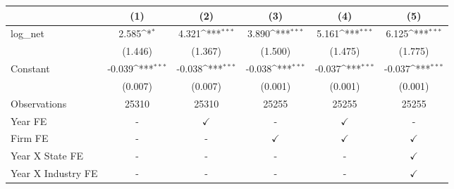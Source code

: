{
\def\sym#1{\ifmmode^{#1}\else\(^{#1}\)\fi}
\begin{tabular}{l*{5}{c}}
\toprule
                    &\multicolumn{1}{c}{(1)}         &\multicolumn{1}{c}{(2)}         &\multicolumn{1}{c}{(3)}         &\multicolumn{1}{c}{(4)}         &\multicolumn{1}{c}{(5)}         \\
\midrule
log\_net             &       2.585\sym{*}  &       4.321\sym{***}&       3.890\sym{***}&       5.161\sym{***}&       6.125\sym{***}\\
                    &     (1.446)         &     (1.367)         &     (1.500)         &     (1.475)         &     (1.775)         \\
Constant            &      -0.039\sym{***}&      -0.038\sym{***}&      -0.038\sym{***}&      -0.037\sym{***}&      -0.037\sym{***}\\
                    &     (0.007)         &     (0.007)         &     (0.001)         &     (0.001)         &     (0.001)         \\
\midrule
Observations        &       25310         &       25310         &       25255         &       25255         &       25255         \\
Year FE             &           -         &$\checkmark$         &           -         &$\checkmark$         &           -         \\
Firm FE             &           -         &           -         &$\checkmark$         &$\checkmark$         &$\checkmark$         \\
Year X State FE     &           -         &           -         &           -         &           -         &$\checkmark$         \\
Year X Industry FE  &           -         &           -         &           -         &           -         &$\checkmark$         \\
\bottomrule
\end{tabular}
}
